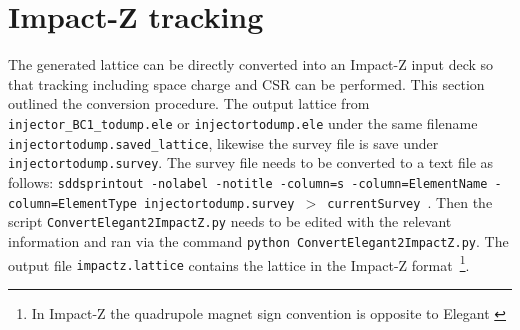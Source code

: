 \documentclass[notitlepage,twocolumn,nofootinbib,showpacs,preprintnumbers,superscriptaddress,amsmath,amssymb]{revtex4-1}
\newcommand{\impactZ}{{\sc Impact-Z }}
\newcommand{\elegant}{{\sc Elegant }}
\begin{document}
\section{Impact-Z tracking}
%
The generated lattice can be directly converted into an \impactZ input deck so that tracking including space charge and CSR can be performed. This section outlined the conversion procedure. The output lattice from  {\tt injector\_BC1\_todump.ele} or  {\tt injectortodump.ele} under the same filename {\tt injectortodump.saved\_lattice}, likewise the survey file is save under {\tt injectortodump.survey}. The survey file needs to be converted to a text file as follows: {\tt sddsprintout -nolabel -notitle -column=s -column=ElementName -column=ElementType injectortodump.survey  $>$ currentSurvey }. Then the script {\tt ConvertElegant2ImpactZ.py} needs to be edited with the relevant information and ran via the command {\tt python ConvertElegant2ImpactZ.py}. The output file {\tt impactz.lattice} contains the lattice in the \impactZ format~\footnote{In \impactZ the quadrupole magnet sign convention is opposite to \elegant}. 

%
%
%
\end{document}
